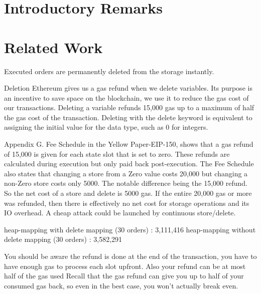 

\section{Introductory Remarks}



\section{Related Work}





Executed orders are permanently deleted from the storage instantly. 



Deletion
Ethereum gives us a gas refund when we delete variables. Its purpose is an incentive to save space on the blockchain, we use it to reduce the gas cost of our transactions.
Deleting a variable refunds 15,000 gas up to a maximum of half the gas cost of the transaction. Deleting with the delete keyword is equivalent to assigning the initial value for the data type, such as 0 for integers.





Appendix G. Fee Schedule in the Yellow Paper-EIP-150, shows that a gas refund of 15,000 is given for each state slot that is set to zero. These refunds are calculated during execution but only paid back post-execution.
The Fee Schedule also states that changing a store from a Zero value costs 20,000 but changing a non-Zero store costs only 5000. The notable difference being the 15,000 refund.
So the net cost of a store and delete is 5000 gas. If the entire 20,000 gas or more was refunded, then there is effectively no net cost for storage operations and its IO overhead. A cheap attack could be launched by continuous store/delete.

heap-mapping with delete mapping (30 orders) : 3,111,416
heap-mapping without delete mapping (30 orders) : 3,582,291


You should be aware the refund is done at the end of the transaction, you have to have enough gas to process each slot upfront. Also your refund can be at most half of the gas used
Recall that the gas refund can give you up to half of your consumed gas back, so even in the best case, you won't actually break even.

